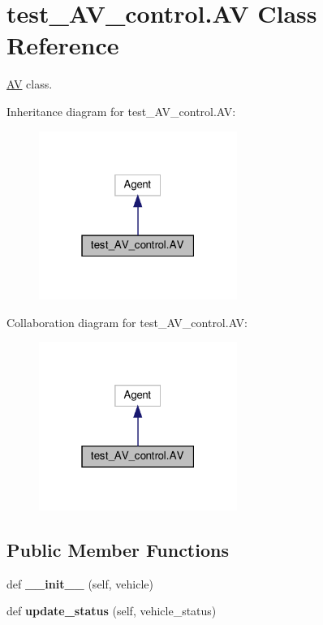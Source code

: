 \hypertarget{classtest__AV__control_1_1AV}{}\section{test\+\_\+\+A\+V\+\_\+control.\+AV Class Reference}
\label{classtest__AV__control_1_1AV}


\hyperlink{classtest__AV__control_1_1AV}{AV} class.  




Inheritance diagram for test\+\_\+\+A\+V\+\_\+control.\+AV\+:\nopagebreak
\begin{figure}[H]
\begin{center}
\leavevmode
\includegraphics[width=183pt]{d5/d53/classtest__AV__control_1_1AV__inherit__graph}
\end{center}
\end{figure}


Collaboration diagram for test\+\_\+\+A\+V\+\_\+control.\+AV\+:\nopagebreak
\begin{figure}[H]
\begin{center}
\leavevmode
\includegraphics[width=183pt]{da/d5b/classtest__AV__control_1_1AV__coll__graph}
\end{center}
\end{figure}
\subsection*{Public Member Functions}
\begin{DoxyCompactItemize}
\item 
\mbox{\label{classtest__AV__control_1_1AV_aa16b44e2795d96ee898307a467ebb22a}} 
def {\bfseries \+\_\+\+\_\+init\+\_\+\+\_\+} (self, vehicle)
\item 
\mbox{\label{classtest__AV__control_1_1AV_ab638809ebc044a4d8dbdf703d5831479}} 
def {\bfseries update\+\_\+status} (self, vehicle\+\_\+status)
\end{DoxyCompactItemize}
